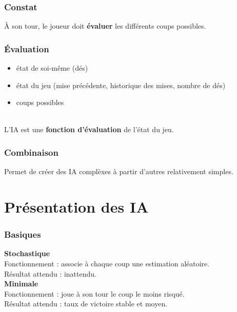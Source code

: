 \documentclass{beamer}
\begin{document}
\begin{frame}
  \frametitle{Constat}

  À son tour, le joueur doit \textbf{évaluer} les différents coups possibles.
  \\[1.5cm]
  \begin{center}
  \end{center}
\end{frame}

\begin{frame}
  \frametitle{Évaluation}

  \begin{itemize}
    \item état de soi-même (dés)
    \item état du jeu (mise précédente, historique des mises, nombre de dés)
    \item coups possibles
  \end{itemize}

  \\[1cm]
  \large L'IA est une \textbf{fonction d'évaluation} de l'état du jeu.
\end{frame}

\begin{frame}
  \frametitle{Combinaison}

  \begin{large}
    Permet de créer des IA complèxes à partir d'autres relativement simples.
    \\[1cm]
  \end{large}
\end{frame}

\section{Présentation des IA}

\begin{frame}
  \frametitle{Basiques}

  \textbf{Stochastique}
  \\
  Fonctionnement : associe à chaque coup une estimation aléatoire.
  \\
  Résultat attendu : inattendu.
  \\[1cm]
  \textbf{Minimale}
  \\
  Fonctionnement : joue à son tour le coup le moins risqué.
  \\
  Résultat attendu : taux de victoire stable et moyen.
\end{frame}
\end{document}
